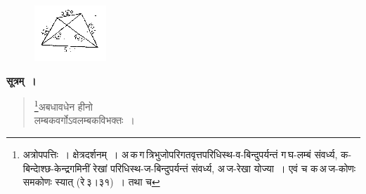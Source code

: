 \documentclass[11pt, openany]{book}
\begin{document}
\begin{figure}[h!]
         \centering
         \includegraphics[scale=0.9]{graphics/capture168.png}
     \end{figure}
\vspace{-2mm}

\textbf{सूत्रम्~।} 
\begin{quote}
    \bs 
    \footnote{अत्रोपपत्तिः~। क्षेत्रदर्शनम्~। अ\,क\,ग\textendash \,त्रिभुजोपरिगतवृत्तपरिधिस्थ-व-बिन्दुपर्यन्तं ग\,घ-लम्बं संवर्ध्य, क-बिन्दाेश्छ-केन्द्रगमिनीं रेखां परिधिस्थ-ज-बिन्दुपर्यन्तं संवर्ध्य, अ\,ज-रेखा योज्या~। एवं च क\,अ\,ज-कोणः समकोणः स्यात् (रे\,३।३१)~। तथा च}अबधावधेन हीनो\\
 लम्बकवर्गोऽवलम्बकविभक्तः~। 
\end{quote}
\newpage%
\end{document}
